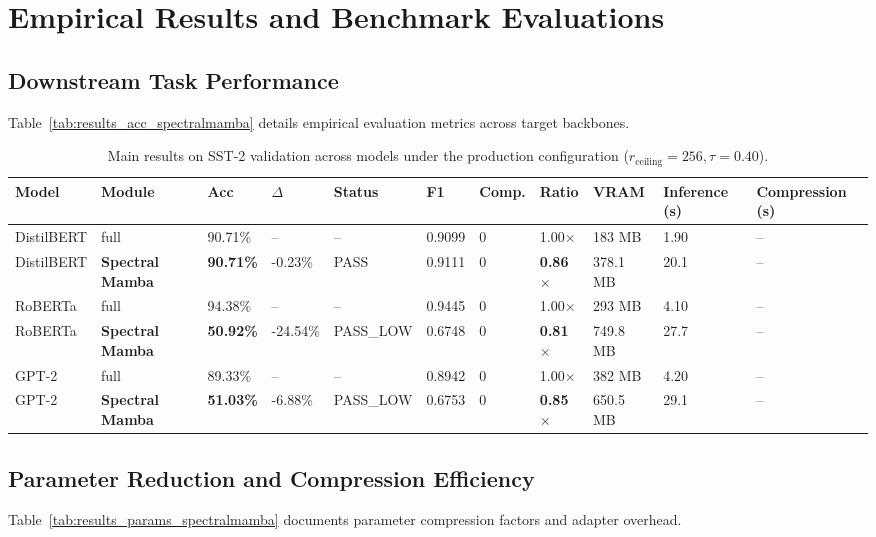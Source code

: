 \section{Empirical Results and Benchmark Evaluations}

\subsection{Downstream Task Performance}
Table~\ref{tab:results_acc_spectralmamba} details empirical evaluation metrics across target backbones.

\begin{table}[t]
\centering
\small
\begin{tabular}{lllllllllll}
\toprule
\textbf{Model} & \textbf{Module} & \textbf{Acc} & \textbf{$\Delta$} & \textbf{Status} & \textbf{F1} & \textbf{Comp.} & \textbf{Ratio} & \textbf{VRAM} & \textbf{Inference (s)} & \textbf{Compression (s)} \\
\midrule
DistilBERT & full & 90.71\% & -- & -- & 0.9099 & 0 & 1.00$\times$ & 183 MB & 1.90 & -- \\
DistilBERT & \textbf{Spectral Mamba} & \textbf{90.71\%} & -0.23\% & PASS & 0.9111 & 0 & \textbf{0.86$\times$} & 378.1 MB & 20.1 & -- \\
RoBERTa & full & 94.38\% & -- & -- & 0.9445 & 0 & 1.00$\times$ & 293 MB & 4.10 & -- \\
RoBERTa & \textbf{Spectral Mamba} & \textbf{50.92\%} & -24.54\% & PASS\_LOW & 0.6748 & 0 & \textbf{0.81$\times$} & 749.8 MB & 27.7 & -- \\
GPT-2 & full & 89.33\% & -- & -- & 0.8942 & 0 & 1.00$\times$ & 382 MB & 4.20 & -- \\
GPT-2 & \textbf{Spectral Mamba} & \textbf{51.03\%} & -6.88\% & PASS\_LOW & 0.6753 & 0 & \textbf{0.85$\times$} & 650.5 MB & 29.1 & -- \\
\bottomrule
\end{tabular}
\caption{Main results on SST-2 validation across models under the production configuration ($r_{\mathrm{ceiling}}=256, \tau=0.40$).}
\label{tab:main_sst2}
\end{table}

\subsection{Parameter Reduction and Compression Efficiency}
Table~\ref{tab:results_params_spectralmamba} documents parameter compression factors and adapter overhead.


